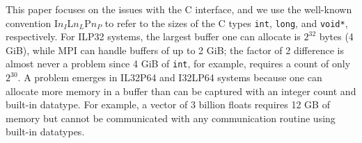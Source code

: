 


This paper focuses on the issues with the C interface, and we use the
well-known convention I$n_{I}$L$n_{L}$P$n_{P}$ to refer to the sizes
of the C types \texttt{int}, \texttt{long}, and \texttt{void*}, respectively.
For ILP32 systems, the largest buffer one can allocate is $2^{32}$ bytes (4 GiB),
while MPI can handle buffers of up to 2 GiB; the factor of 2 difference is
almost never a problem since 4 GiB of \texttt{int}, for example, requires
a count of only $2^{30}$.
 A problem emerges in IL32P64 and I32LP64 systems because one can allocate
 more memory in a buffer than can be captured with an integer count and built-in datatype.
 For example, a vector of 3 billion floats requires 12 GB of memory but cannot be 
 communicated with any communication routine using built-in datatypes.

